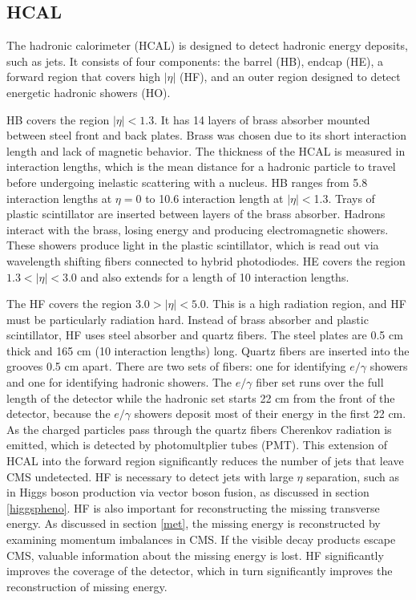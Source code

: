 \documentclass[oneside, letterpaper, oldfontcommands]{memoir}
\begin{document}
\subsection{HCAL}\label{hcal}

\qquad The hadronic calorimeter (HCAL) is designed to detect hadronic energy deposits, such as jets. It consists of four components: the barrel (HB), endcap (HE), a forward region that covers high $|\eta|$ (HF), and an outer region designed to detect energetic hadronic showers (HO).

\qquad HB covers the region $|\eta| < 1.3$. It has 14 layers of brass absorber mounted between steel front and back plates. Brass was chosen due to its short interaction length and lack of magnetic behavior. The thickness of the HCAL is measured in interaction lengths, which is the mean distance for a hadronic particle to travel before undergoing inelastic scattering with a nucleus. HB ranges from 5.8 interaction lengths at $\eta = 0$ to 10.6 interaction length at $|\eta| < $1.3.  Trays of plastic scintillator are inserted between layers of the brass absorber. Hadrons interact with the brass, losing energy and producing electromagnetic showers. These showers produce light in the plastic scintillator, which is read out via wavelength shifting fibers connected to hybrid photodiodes. HE covers the region $1.3 < |\eta| < 3.0$ and also extends for a length of 10 interaction lengths.

\qquad The HF covers the region $3.0 > |\eta| < 5.0$. This is a high radiation region, and HF must be particularly radiation hard. Instead of brass absorber and plastic scintillator, HF uses steel absorber and quartz fibers. The steel plates are 0.5 cm thick and 165 cm (10 interaction lengths) long. Quartz fibers are inserted into the grooves 0.5 cm apart. There are two sets of fibers: one for identifying $e/\gamma$ showers and one for identifying hadronic showers. The $e/\gamma$ fiber set runs over the full length of the detector while the hadronic set starts 22 cm from the front of the detector, because the $e/\gamma$ showers deposit most of their energy in the first 22 cm. As the charged particles pass through the quartz fibers Cherenkov radiation is emitted, which is detected by photomultplier tubes (PMT). This extension of HCAL into the forward region significantly reduces the number of jets that leave CMS undetected. HF is necessary to detect jets with large $\eta$ separation, such as in Higgs boson production via vector boson fusion, as discussed in section \ref{higgspheno}. HF is also important for reconstructing the missing transverse energy. As discussed in section \ref{met}, the missing energy is reconstructed by examining momentum imbalances in CMS. If the visible decay products escape CMS, valuable information about the missing energy is lost. HF significantly improves the coverage of the detector, which in turn significantly improves the reconstruction of missing energy.
\end{document}
